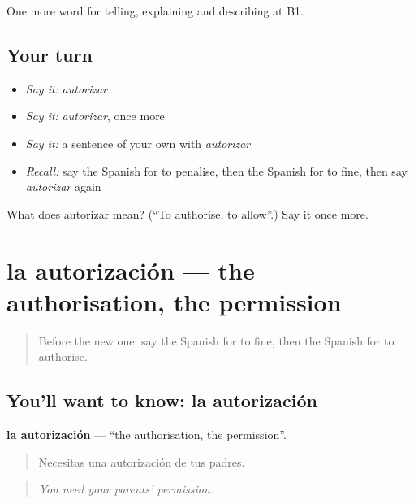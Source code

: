 \begin{grammarlens}[title={What you've built}]
One more word for telling, explaining and describing at B1.
\end{grammarlens}

\subsection*{Your turn}
\begin{itemize}
\raggedright
  \item \emph{Say it:} \emph{autorizar}
  \item \emph{Say it:} \emph{autorizar}, once more
  \item \emph{Say it:} a sentence of your own with \emph{autorizar}
  \item \emph{Recall:} say the Spanish for to penalise, then the Spanish for to fine, then say \emph{autorizar} again
\end{itemize}

\begin{tcolorbox}[breakable,colback=teal!4,colframe=teal!35!black,title={Before you move on}]
What does autorizar mean? (\textquotedblleft{}To authorise, to allow\textquotedblright{}.) Say it once more.
\end{tcolorbox}
\section[la autorización]{la autorización — the authorisation, the permission}

\label{lesson:ES-C624-autorizacion}



\begin{quote}
Before the new one: say the Spanish for to fine, then the Spanish for to authorise.
\end{quote}

\subsection*{You'll want to know: la autorización}
\textbf{la autorización} — \textquotedblleft{}the authorisation, the permission\textquotedblright{}.

\begin{quote}
Necesitas una autorización de tus padres.
\end{quote}

\begin{quote}
\emph{You need your parents' permission.}
\end{quote}


